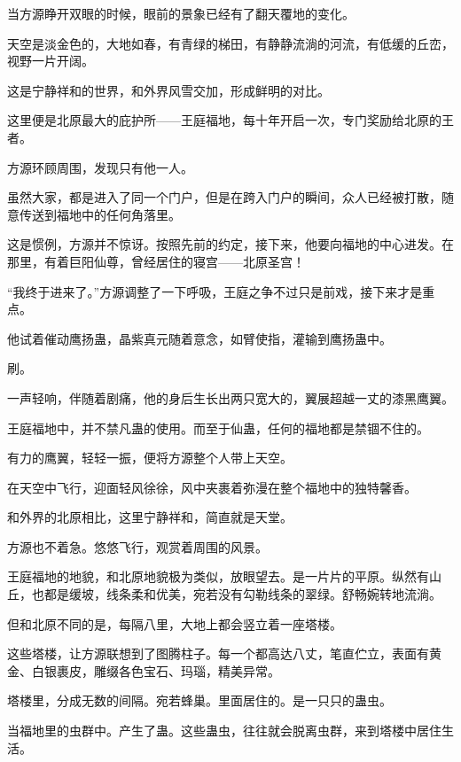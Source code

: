 
\begin{this_body}

当方源睁开双眼的时候，眼前的景象已经有了翻天覆地的变化。

天空是淡金色的，大地如春，有青绿的梯田，有静静流淌的河流，有低缓的丘峦，视野一片开阔。

这是宁静祥和的世界，和外界风雪交加，形成鲜明的对比。

这里便是北原最大的庇护所——王庭福地，每十年开启一次，专门奖励给北原的王者。

方源环顾周围，发现只有他一人。

虽然大家，都是进入了同一个门户，但是在跨入门户的瞬间，众人已经被打散，随意传送到福地中的任何角落里。

这是惯例，方源并不惊讶。按照先前的约定，接下来，他要向福地的中心进发。在那里，有着巨阳仙尊，曾经居住的寝宫——北原圣宫！

“我终于进来了。”方源调整了一下呼吸，王庭之争不过只是前戏，接下来才是重点。

他试着催动鹰扬蛊，晶紫真元随着意念，如臂使指，灌输到鹰扬蛊中。

刷。

一声轻响，伴随着剧痛，他的身后生长出两只宽大的，翼展超越一丈的漆黑鹰翼。

王庭福地中，并不禁凡蛊的使用。而至于仙蛊，任何的福地都是禁锢不住的。

有力的鹰翼，轻轻一振，便将方源整个人带上天空。

在天空中飞行，迎面轻风徐徐，风中夹裹着弥漫在整个福地中的独特馨香。

和外界的北原相比，这里宁静祥和，简直就是天堂。

方源也不着急。悠悠飞行，观赏着周围的风景。

王庭福地的地貌，和北原地貌极为类似，放眼望去。是一片片的平原。纵然有山丘，也都是缓坡，线条柔和优美，宛若没有勾勒线条的翠绿。舒畅婉转地流淌。

但和北原不同的是，每隔八里，大地上都会竖立着一座塔楼。

这些塔楼，让方源联想到了图腾柱子。每一个都高达八丈，笔直伫立，表面有黄金、白银裹皮，雕缀各色宝石、玛瑙，精美异常。

塔楼里，分成无数的间隔。宛若蜂巢。里面居住的。是一只只的蛊虫。

当福地里的虫群中。产生了蛊。这些蛊虫，往往就会脱离虫群，来到塔楼中居住生活。


\end{this_body}
